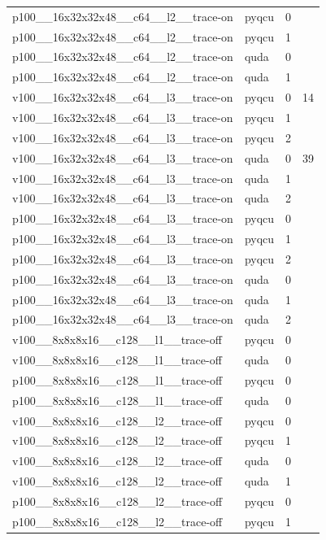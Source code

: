\begin{table}[htbp]
\begin{tabular}{@{}llrr@{}}
p100\_\_16x32x32x48\_\_c64\_\_l2\_\_trace-on & pyqcu & 0 &  \\
p100\_\_16x32x32x48\_\_c64\_\_l2\_\_trace-on & pyqcu & 1 &  \\
p100\_\_16x32x32x48\_\_c64\_\_l2\_\_trace-on & quda & 0 &  \\
p100\_\_16x32x32x48\_\_c64\_\_l2\_\_trace-on & quda & 1 &  \\
v100\_\_16x32x32x48\_\_c64\_\_l3\_\_trace-on & pyqcu & 0 & 14 \\
v100\_\_16x32x32x48\_\_c64\_\_l3\_\_trace-on & pyqcu & 1 &  \\
v100\_\_16x32x32x48\_\_c64\_\_l3\_\_trace-on & pyqcu & 2 &  \\
v100\_\_16x32x32x48\_\_c64\_\_l3\_\_trace-on & quda & 0 & 39 \\
v100\_\_16x32x32x48\_\_c64\_\_l3\_\_trace-on & quda & 1 &  \\
v100\_\_16x32x32x48\_\_c64\_\_l3\_\_trace-on & quda & 2 &  \\
p100\_\_16x32x32x48\_\_c64\_\_l3\_\_trace-on & pyqcu & 0 &  \\
p100\_\_16x32x32x48\_\_c64\_\_l3\_\_trace-on & pyqcu & 1 &  \\
p100\_\_16x32x32x48\_\_c64\_\_l3\_\_trace-on & pyqcu & 2 &  \\
p100\_\_16x32x32x48\_\_c64\_\_l3\_\_trace-on & quda & 0 &  \\
p100\_\_16x32x32x48\_\_c64\_\_l3\_\_trace-on & quda & 1 &  \\
p100\_\_16x32x32x48\_\_c64\_\_l3\_\_trace-on & quda & 2 &  \\
v100\_\_8x8x8x16\_\_c128\_\_l1\_\_trace-off & pyqcu & 0 &  \\
v100\_\_8x8x8x16\_\_c128\_\_l1\_\_trace-off & quda & 0 &  \\
p100\_\_8x8x8x16\_\_c128\_\_l1\_\_trace-off & pyqcu & 0 &  \\
p100\_\_8x8x8x16\_\_c128\_\_l1\_\_trace-off & quda & 0 &  \\
v100\_\_8x8x8x16\_\_c128\_\_l2\_\_trace-off & pyqcu & 0 &  \\
v100\_\_8x8x8x16\_\_c128\_\_l2\_\_trace-off & pyqcu & 1 &  \\
v100\_\_8x8x8x16\_\_c128\_\_l2\_\_trace-off & quda & 0 &  \\
v100\_\_8x8x8x16\_\_c128\_\_l2\_\_trace-off & quda & 1 &  \\
p100\_\_8x8x8x16\_\_c128\_\_l2\_\_trace-off & pyqcu & 0 &  \\
p100\_\_8x8x8x16\_\_c128\_\_l2\_\_trace-off & pyqcu & 1 &  \\

\end{tabular}
\end{table}
